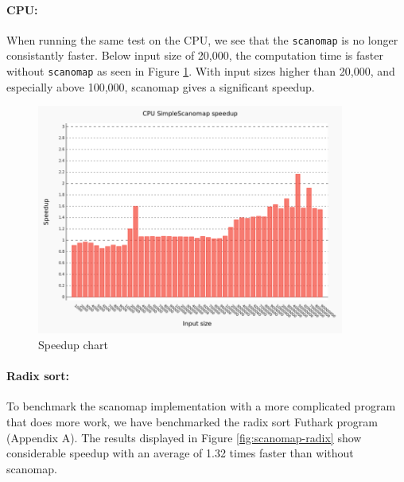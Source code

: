 \documentclass[11pt,bibliography=totocnumbered]{article}
\begin{document}
\paragraph*{CPU:} When running the same test on the CPU, we see that the \texttt{scanomap} is no longer consistantly faster. Below input size of 20,000, the computation time is faster without \texttt{scanomap} as seen in Figure \ref{fig:CPU-map-scan fusion speedup}. With input sizes higher than 20,000, and especially above 100,000, scanomap gives a significant speedup.

\begin{figure}[h!]
  \centering
    \includegraphics[width=0.9\textwidth]{images/futhark-c-comparing.png}
  \caption{Speedup chart}
  \label{fig:CPU-map-scan fusion speedup}
\end{figure}

\paragraph*{Radix sort:}

To benchmark the scanomap implementation with a more complicated program that does more work, we have benchmarked the radix sort Futhark program (Appendix A). The results displayed in Figure \ref{fig:scanomap-radix} show considerable speedup with an average of 1.32 times faster than without scanomap.
\end{document}
